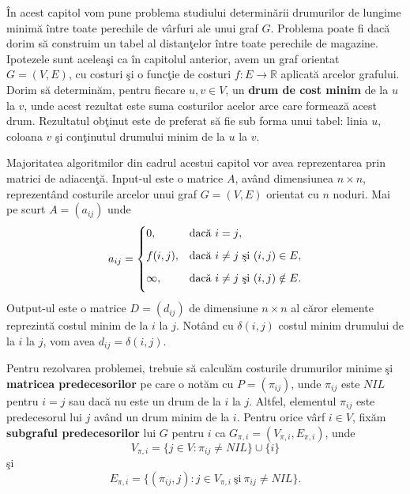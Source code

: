 \documentclass[11pt,a4paper]{report}
\newcommand{\R}{\mathbb{R}}
\begin{document}
     \^ In acest capitol vom pune problema studiului determin\u arii drumurilor de lungime minim\u a \^ intre toate perechile de v\^ arfuri ale unui graf $G$. Problema poate fi dac\u a dorim s\u a construim un tabel al distan\c telor \^ intre toate perechile de magazine. Ipotezele sunt acelea\c si ca \^ in capitolul anterior, avem un graf orientat $G=(V,E)$, cu costuri \c si o func\c tie de costuri $f:E \longrightarrow \R $ aplicat\u a arcelor grafului. Dorim s\u a determin\u am, pentru fiecare $u,v\in V$, un \textbf{drum de cost minim} de la $u$ la $v$, unde acest rezultat este suma costurilor acelor arce care formeaz\u a acest drum. Rezultatul ob\c tinut este de preferat s\u a fie sub forma unui tabel: linia $u$, coloana $v$ \c si con\c tinutul drumului minim de la $u$ la $v$.
     
     Majoritatea algoritmilor din cadrul acestui capitol vor avea reprezentarea prin matrici de adiacen\c t\u a. Input-ul este o matrice $A$, av\^ and dimensiunea $n\times n$, reprezent\^ and costurile arcelor unui graf $G=(V,E)$ orientat cu $n$ noduri. Mai pe scurt $A=(a_{ij})$ unde
     \begin{equation*}
     a_{ij}=
    \begin{cases}
     0,&\text{dac\u a $i=j$}, \medskip\\
    f(i,j),& \text{dac\u a $i\ne j$ \c si $(i,j)\in E$}, \medskip\\
     \infty,&\text{dac\u a $i\ne j$ \c si $(i,j)\notin E$}.\medskip
    \end{cases}
     \end{equation*}
     Output-ul este o matrice $D=(d_{ij})$ de dimensiune $n\times n$ al c\u aror elemente reprezint\u a costul minim de la $i$ la $j$. Not\^ and cu $\delta(i,j)$  costul minim drumului de la $i$ la $j$, vom avea $d_{ij}=\delta(i,j)$.
     
     Pentru rezolvarea problemei, trebuie s\u a calcul\u am costurile drumurilor minime \c si \textbf{matricea predecesorilor} pe care o not\u am cu $P=(\pi_{ij})$, unde $\pi_{ij}$ este $NIL$ pentru $i=j$ sau dac\u a nu este un drum de la $i$ la $j$. Altfel, elementul $\pi_{ij}$ este predecesorul lui $j$ av\^ and un drum minim de la $i$. Pentru orice v\^arf $i\in V$, fix\u am \textbf{subgraful predecesorilor} lui $G$ pentru $i$ ca $G_{\pi,i}=(V_{\pi,i},E_{\pi,i})$, unde
     \begin{equation*}
     V_{\pi,i}=\{j\in V:\pi_{ij}\neq NIL\}\cup \{i\}
     \end{equation*}
     \c si 
     \begin{equation*}
     E_{\pi,i}=\{(\pi_{ij},j):j\in V_{\pi,i} \ \text{\c si} \ \pi_{ij}\neq NIL\}.
     \end{equation*}
     
\end{document}
